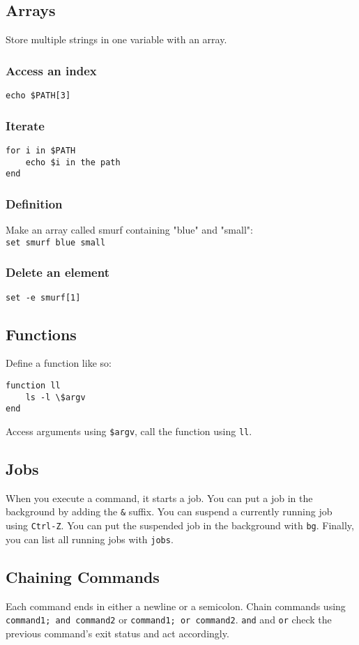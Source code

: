 \documentclass[10pt]{extarticle}
\begin{document}
\begin{paracol}{2}
\subsection*{Arrays}
Store multiple strings in one variable with an array.
\subsubsection*{Access an index}
\texttt{echo \$PATH[3]}
\subsubsection*{Iterate}
\begin{verbatim}
for i in $PATH
    echo $i in the path
end
\end{verbatim}
\subsubsection*{Definition}
Make an array called smurf containing "blue" and "small":\\
\texttt{set smurf blue small}
\subsubsection*{Delete an element}
\texttt{set -e smurf[1]}

\subsection*{Functions}
Define a function like so:\\
\begin{verbatim}
function ll
    ls -l \$argv
end
\end{verbatim}
Access arguments using \texttt{\$argv}, call the function using \texttt{ll}.

\subsection*{Jobs}
When you execute a command, it starts a job. You can put a job in the background
by adding the \texttt{\&} suffix. You can suspend a currently running job using
\texttt{Ctrl-Z}. You can put the suspended job in the background with
\texttt{bg}. Finally, you can list all running jobs with \texttt{jobs}.

\subsection*{Chaining Commands}
Each command ends in either a newline or a semicolon. Chain commands using
\texttt{command1; and command2} or \texttt{command1; or command2}. \texttt{and}
and \texttt{or} check the previous command's exit status and act accordingly.


\end{paracol}
\end{document}
